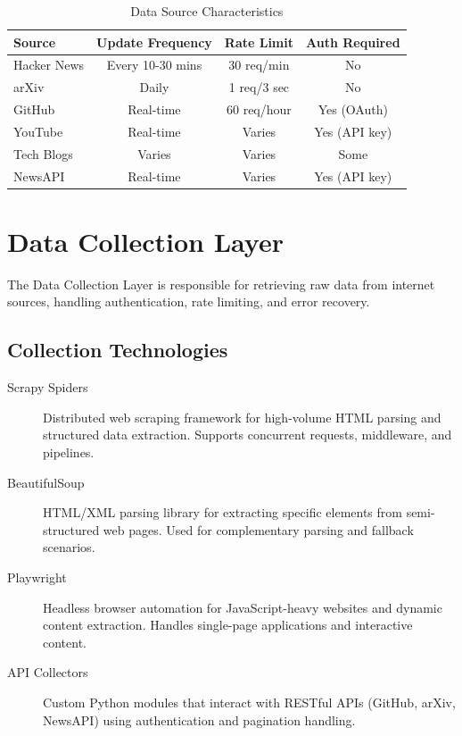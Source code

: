 \documentclass[12pt,a4paper]{report}
\begin{document}
\begin{table}[H]
\centering
\small
\begin{tabular}{|l|c|c|c|}
\hline
\textbf{Source} & \textbf{Update Frequency} & \textbf{Rate Limit} & \textbf{Auth Required} \\
\hline
Hacker News & Every 10-30 mins & 30 req/min & No \\
arXiv & Daily & 1 req/3 sec & No \\
GitHub & Real-time & 60 req/hour & Yes (OAuth) \\
YouTube & Real-time & Varies & Yes (API key) \\
Tech Blogs & Varies & Varies & Some \\
NewsAPI & Real-time & Varies & Yes (API key) \\
\hline
\end{tabular}
\caption{Data Source Characteristics}
\end{table}

\section{Data Collection Layer}

The Data Collection Layer is responsible for retrieving raw data from internet sources, handling authentication, rate limiting, and error recovery.

\subsection{Collection Technologies}

\begin{description}
    \item[Scrapy Spiders] Distributed web scraping framework for high-volume HTML parsing and structured data extraction. Supports concurrent requests, middleware, and pipelines.
    
    \item[BeautifulSoup] HTML/XML parsing library for extracting specific elements from semi-structured web pages. Used for complementary parsing and fallback scenarios.
    
    \item[Playwright] Headless browser automation for JavaScript-heavy websites and dynamic content extraction. Handles single-page applications and interactive content.
    
    \item[API Collectors] Custom Python modules that interact with RESTful APIs (GitHub, arXiv, NewsAPI) using authentication and pagination handling.
\end{description}
\end{document}
